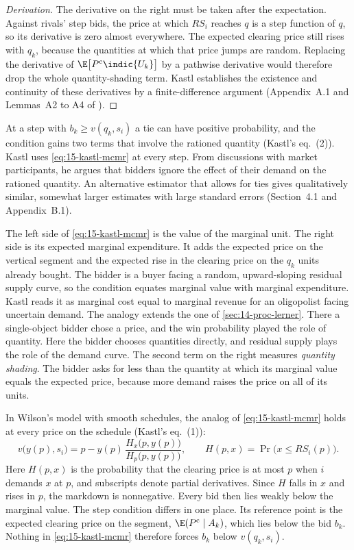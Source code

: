 \begin{proof}[Derivation]
The derivative on the right must be taken after the expectation. Against rivals' step bids, the price at which
$RS_i$ reaches $q$ is a step function of $q$, so its derivative is zero almost everywhere. The expected clearing
price still rises with $q_k$, because the quantities at which that price jumps are random. Replacing the
derivative of $\E\bigl[P^{\mathrm c}\indic\{U_k\}\bigr]$ by a pathwise derivative would therefore drop the whole
quantity-shading term. Kastl establishes the existence and continuity of these derivatives by a finite-difference
argument (Appendix~A.1 and Lemmas~A2 to A4 of \citealp{Kastl2011}).
\end{proof}

At a step with $b_k\ge v(q_k,s_i)$ a tie can have positive probability, and the condition gains two terms that
involve the rationed quantity (Kastl's eq.~(2)). Kastl uses \eqref{eq:15-kastl-mcmr} at every step. From discussions
with market participants, he argues that bidders ignore the effect of their demand on the rationed quantity.
An alternative estimator that allows for ties gives qualitatively similar, somewhat larger estimates with
large standard errors (Section~4.1 and Appendix~B.1).

 The left side of \eqref{eq:15-kastl-mcmr} is the value of the marginal unit. The
right side is its expected marginal expenditure. It adds the expected price on the vertical segment and the
expected rise in the clearing price on the $q_k$ units already bought. The bidder is a buyer facing a random,
upward-sloping residual supply curve, so the condition equates marginal value with marginal expenditure.
Kastl reads it as marginal cost equal to marginal revenue for an oligopolist facing uncertain demand. The
analogy extends the one of \cref{sec:14-proc-lerner}. There a single-object bidder chose a price, and the win
probability played the role of quantity. Here the bidder chooses quantities directly, and residual supply
plays the role of the demand curve. The second term on the right measures \emph{quantity shading}. The
bidder asks for less than the quantity at which its marginal value equals the expected price, because more
demand raises the price on all of its units.

 In Wilson's model with smooth schedules, the analog of
\eqref{eq:15-kastl-mcmr} holds at every price on the schedule (Kastl's eq.~(1)):
\begin{equation}\label{eq:15-wilson-uniform}
v\bigl(y(p),s_i\bigr)=p-y(p)\,\frac{H_x\bigl(p,y(p)\bigr)}{H_p\bigl(p,y(p)\bigr)},
\qquad H(p,x)=\Pr\bigl(x\le RS_i(p)\bigr).
\end{equation}
Here $H(p,x)$ is the probability that the clearing price is at most $p$ when $i$ demands $x$ at $p$, and
subscripts denote partial derivatives. Since $H$ falls in $x$ and rises in $p$, the markdown is nonnegative.
Every bid then lies weakly below the marginal value. The step condition differs in one place. Its reference
point is the expected clearing price on the segment, $\E(P^{\mathrm c}\mid A_k)$, which lies below the bid
$b_k$. Nothing in \eqref{eq:15-kastl-mcmr} therefore forces $b_k$ below $v(q_k,s_i)$.

